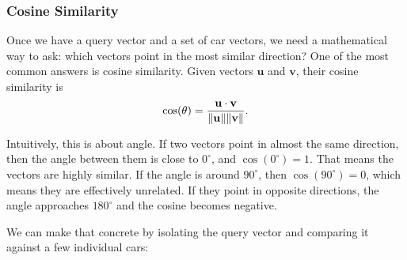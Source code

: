 \documentclass[12pt]{article}
\begin{document}
\subsubsection{Cosine Similarity}

Once we have a query vector and a set of car vectors, we need a
mathematical way to ask: which vectors point in the most similar
direction? One of the most common answers is cosine similarity. Given
vectors $\mathbf{u}$ and $\mathbf{v}$, their cosine similarity is
\[
\cos(\theta) =
\frac{\mathbf{u} \cdot \mathbf{v}}{\norm{\mathbf{u}} \norm{\mathbf{v}}}.
\]

Intuitively, this is about angle. If two vectors point in almost the same
direction, then the angle between them is close to $0^\circ$, and
$\cos(0^\circ) = 1$. That means the vectors are highly similar. If the
angle is around $90^\circ$, then $\cos(90^\circ) = 0$, which means they
are effectively unrelated. If they point in opposite directions, the angle
approaches $180^\circ$ and the cosine becomes negative.

We can make that concrete by isolating the query vector and comparing it
against a few individual cars:
\end{document}

